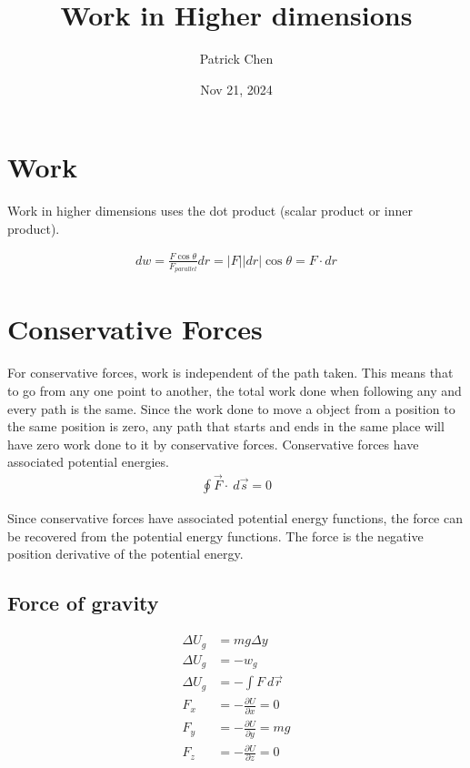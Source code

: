 \documentclass{article}
\title{Work in Higher dimensions}
\author{Patrick Chen}
\date{Nov 21, 2024}
\theoremstyle{mytheoremstyle}
\theoremstyle{mytheoremstyle}
\theoremstyle{myproblemstyle}
\begin{document}
    \maketitle
    \section*{Work}
    Work in higher dimensions uses the dot product (scalar product or inner
    product).

    \begin{align*}
        dw = \frac{F\cos \theta}{F_{parallel}} dr = |F||dr| \cos \theta = F \cdot dr
    \end{align*}

    \section*{Conservative Forces}
    For conservative forces, work is independent of the path taken. This means
    that to go from any one point to another, the total work done when following
    any and every path is the same. Since the work done to move a object from a
    position to the same position is zero, any path that starts and ends in the
    same place will have zero work done to it by conservative forces.
    Conservative forces have associated potential energies.
    \begin{align*}
        \oint \vec{F} \cdot \ d\vec{s} = 0
    \end{align*}

    Since conservative forces have associated potential energy functions, the
    force can be recovered from the potential energy functions. The force is the
    negative position derivative of the potential energy.
    \subsection*{Force of gravity}
    \begin{align*}
        \Delta U_g &= mg\Delta y \\
        \Delta U_g &= -w_g \\
        \Delta U_g &= -\int F \ d \vec{r} \\
        F_x &= -\frac{\partial U}{\partial x} = 0 \\
        F_y &= -\frac{\partial U}{\partial y} = mg \\
        F_z &= -\frac{\partial U}{\partial z} = 0
    \end{align*}
\end{document}
